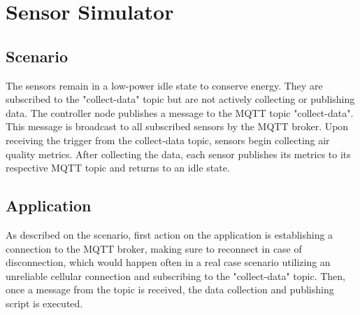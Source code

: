 \section{Sensor Simulator}
\subsection{Scenario}
The sensors remain in a low-power idle state to conserve energy. They are subscribed to the "collect-data" topic but are not actively collecting or publishing data. The controller node publishes a message to the MQTT topic "collect-data". This message is broadcast to all subscribed sensors by the MQTT broker. Upon receiving the trigger from the collect-data topic, sensors begin collecting air quality metrics. After collecting the data, each sensor publishes its metrics to its respective MQTT topic and returns to an idle state.
\subsection{Application}
As described on the scenario, first action on the application is establishing a connection to the MQTT broker, making sure to reconnect in case of disconnection, which would happen often in a real case scenario utilizing an unreliable cellular connection and subscribing to the "collect-data" topic. Then, once a message from the topic is received, the data collection and publishing script is executed.

